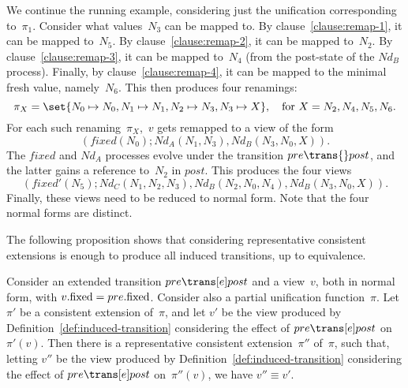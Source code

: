 
\begin{example}
We continue the running example, considering just the unification
corresponding to~$\pi_1$.  Consider what values~$N_3$ can be mapped to.  By
clause~\ref{clause:remap-1}, it can be mapped to~$N_5$.  By
clause~\ref{clause:remap-2}, it can be mapped to~$N_2$.  By
clause~\ref{clause:remap-3}, it can be mapped to~$N_4$ (from the post-state of
the $Nd_B$ process).  Finally, by clause~\ref{clause:remap-4}, it can be
mapped to the minimal fresh value, namely~$N_6$.
%
This then produces four renamings:
\[
\pi_X = \set{N_0 \mapsto N_0, N_1 \mapsto N_1, N_2 \mapsto N_3, N_3 \mapsto X},
\quad \mbox{for $X = N_2, N_4, N_5, N_6$}.
\]
For each such renaming~$\pi_X$,\, $v$ gets remapped to a view of the form
\[
(fixed(N_0); Nd_A(N_1, N_3), Nd_B(N_3, N_0, X)).
\]
The $fixed$ and $Nd_A$ processes evolve under the transition \( pre
\trans{} post \), and the latter gains a reference to~$N_2$ in
$post$.  This produces the four views
\[
(fixed'(N_5); Nd_C(N_1, N_2, N_3), Nd_B(N_2, N_0, N_4), Nd_B(N_3, N_0, X)).
\]
Finally, these views need to be reduced to normal form.  Note that the four
normal forms are distinct.
\end{example}


The following proposition shows that considering representative consistent
extensions is enough to produce all induced transitions, up to equivalence. 
%
\begin{prop}
\label{prop:unifying-renaming}
Consider an extended transition $pre \trans[e] post$ and a view~$v$, both in
normal form, with $v.\mathrm{fixed} = pre.\mathrm{fixed}$.  Consider also a partial
unification function~$\pi$.
%
Let $\pi'$ be a consistent extension of~$\pi$, and
let $v'$ be the view produced by Definition~\ref{def:induced-transition}
considering the effect of $pre \trans[e] post$ on~$\pi'(v)$.  
%
Then there is a representative consistent extension~$\pi''$ of~$\pi$, such
that, letting $v''$ be the view produced by
Definition~\ref{def:induced-transition} considering the effect of $pre
\trans[e] post$ on~$\pi''(v)$, we have $v'' \equiv v'$.
\end{prop}


